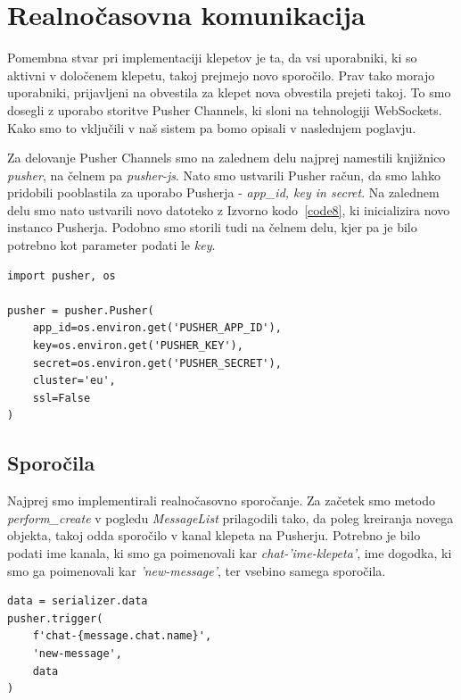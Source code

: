 \documentclass[a4paper,12pt,openright]{book}
\begin{document}
\section{Realnočasovna komunikacija}
Pomembna stvar pri implementaciji klepetov je ta, da vsi uporabniki, ki so aktivni v določenem klepetu, takoj prejmejo novo sporočilo.
Prav tako morajo uporabniki, prijavljeni na obvestila za klepet nova obvestila prejeti takoj.
To smo dosegli z uporabo storitve Pusher Channels, ki sloni na tehnologiji WebSockets.
Kako smo to vključili v naš sistem pa bomo opisali v naslednjem poglavju.

Za delovanje Pusher Channels smo na zalednem delu najprej namestili knjižnico \textit{pusher}, na čelnem pa \textit{pusher-js}.
Nato smo ustvarili Pusher račun, da smo lahko pridobili pooblastila za uporabo Pusherja - \textit{app\_id, key in secret}.
Na zalednem delu smo nato ustvarili novo datoteko z Izvorno kodo~\ref{code8}, ki inicializira novo instanco Pusherja.
Podobno smo storili tudi na čelnem delu, kjer pa je bilo potrebno kot parameter podati le \textit{key}.
\begin{lstlisting}[label=code8,caption=Izvorna koda\, ki kreira novo instanco Pusherja na zalednem delu.,frame=tb,captionpos=b]
import pusher, os

pusher = pusher.Pusher(
    app_id=os.environ.get('PUSHER_APP_ID'),
    key=os.environ.get('PUSHER_KEY'),
    secret=os.environ.get('PUSHER_SECRET'),
    cluster='eu',
    ssl=False
)    
\end{lstlisting}

\subsection{Sporočila}
Najprej smo implementirali realnočasovno sporočanje.
Za začetek smo metodo \textit{perform\_create} v pogledu \textit{MessageList} prilagodili tako, da poleg kreiranja novega objekta, takoj odda sporočilo v kanal klepeta na Pusherju.
Potrebno je bilo podati ime kanala, ki smo ga poimenovali kar \textit{chat-'ime-klepeta'}, ime dogodka, ki smo ga poimenovali kar \textit{'new-message'}, ter vsebino samega sporočila.
\begin{lstlisting}[label=code9,caption=Pošiljanje novega sporočila vsem odjemalcem naročenim na kanal chat-{message.chat.id} z uporabo storitve Pusher.,frame=tb,captionpos=b]
data = serializer.data
pusher.trigger(
    f'chat-{message.chat.name}',
    'new-message',
    data
)
\end{lstlisting}
\end{document}
